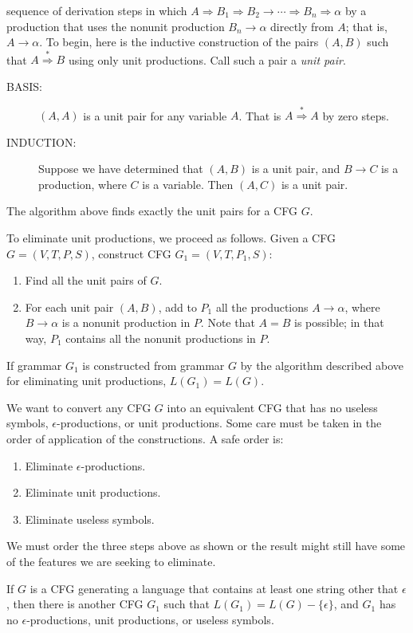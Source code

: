 \documentclass[]{article}
\begin{document}
      sequence of derivation steps in which
      $A \Rightarrow B_1 \Rightarrow B_2 \rightarrow \cdots \Rightarrow B_n
      \Rightarrow \alpha$ by a production that uses the nonunit production $B_n
      \rightarrow \alpha$ directly from $A$; that is, $A \rightarrow \alpha$.
      To begin, here is the inductive construction of the pairs $(A,B)$ such
      that $A \overset{*}{\Rightarrow} B$ using only unit productions. Call such
      a pair a \emph{unit pair}.
        \begin{description}
          \item[BASIS:] $(A,A)$ is a unit pair for any variable $A$. That is $A
          \overset{*}{\Rightarrow} A$ by zero steps.
          \item[INDUCTION:] Suppose we have determined that $(A,B)$ is a unit
          pair, and $B \rightarrow C$ is a production, where $C$ is a variable.
          Then $(A,C)$ is a unit pair.
        \end{description}
        \begin{thm}
          The algorithm above finds exactly the unit pairs for a CFG $G$.
        \end{thm}
      To eliminate unit productions, we proceed as follows. Given a CFG
      $G = (V,T,P,S)$, construct CFG $G_1 = (V,T,P_1,S)$:
        \begin{enumerate}
          \item Find all the unit pairs of $G$.
          \item For each unit pair $(A,B)$, add to $P_1$ all the productions
          $A \rightarrow \alpha$, where $B \rightarrow \alpha$ is a nonunit
          production in $P$. Note that $A = B$ is possible; in that way, $P_1$
          contains all the nonunit productions in $P$.
        \end{enumerate}
        \begin{thm}
          If grammar $G_1$ is constructed from grammar $G$ by the algorithm
          described above for eliminating unit productions, $L(G_1) = L(G)$.
        \end{thm}
      We want to convert any CFG $G$ into an equivalent CFG that has no useless
      symbols, $\epsilon$-productions, or unit productions. Some care must be
      taken in the order of application of the constructions. A safe order is:
        \begin{enumerate}
          \item Eliminate $\epsilon$-productions.
          \item Eliminate unit productions.
          \item Eliminate useless symbols.
        \end{enumerate}
      We must order the three steps above as shown or the result might still
      have some of the features we are seeking to eliminate.
        \begin{thm}
          If $G$ is a CFG generating a language that contains at least one
          string other that $\epsilon$, then there is another CFG $G_1$ such
          that $L(G_1) = L(G) - \{\epsilon\}$, and $G_1$ has no
          $\epsilon$-productions, unit productions, or useless symbols.
        \end{thm}
\end{document}
